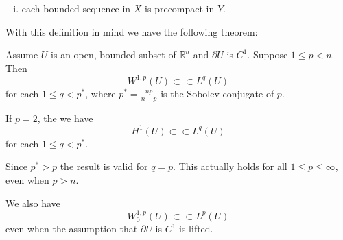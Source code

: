 \documentclass[11pt, a4paper]{article}
\begin{document}
\begin{appendices}
\begin{mydef}
\begin{enumerate}[i)]
	\item each bounded sequence in $X$ is precompact in $Y$.
\end{enumerate}
\end{mydef}

With this definition in mind we have the following theorem:
\begin{theorem}
\label{thm:Rellich}
Assume $U$ is an open, bounded subset of $\mathbb{R}^n$ and $\partial U$ is $C^1$.
Suppose $1\leq p < n$. Then
\begin{equation}
\label{Rellich}
W^{1,p}(U) \subset \subset L^q(U)
\end{equation}
for each $1\leq q < p^*$, where $p^* = \frac{np}{n-p}$ is the Sobolev conjugate of $p$.
\end{theorem}
\setcounter{rem}{0}
\begin{rem}
If $p=2$, the we have
\begin{equation*}
H^1(U) \subset \subset L^q(U)
\end{equation*}
for each $1\leq q < p^*$.
\end{rem}
\begin{rem}
Since $p^* > p$ the result is valid for $q=p$. This actually holds for all $1\leq p \leq \infty$, even when $p > n$.
\end{rem}
\begin{rem}
We also have 
\begin{equation*}
W^{1,p}_0(U) \subset \subset L^p(U)
\end{equation*}
even when the assumption that $\partial U$ is $C^1$ is lifted.
\end{rem}



\end{appendices}
\newpage


\end{document}
